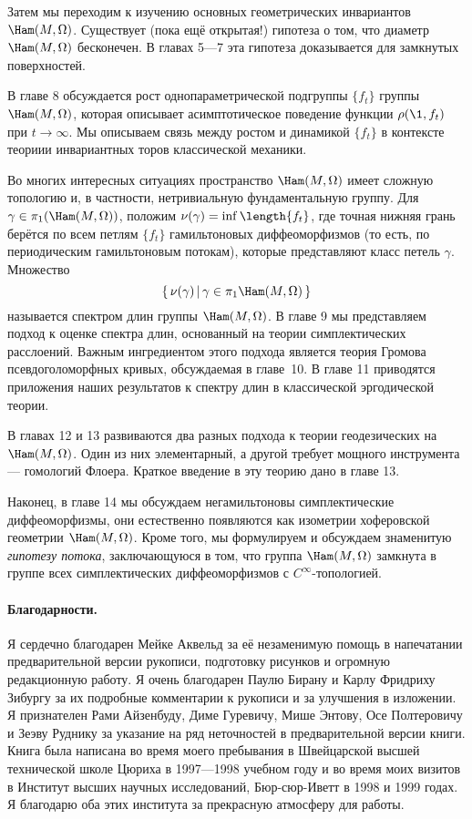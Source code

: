 Затем мы переходим к изучению основных геометрических инвариантов $\Ham(M,\Omega)$.
Существует (пока ещё открытая!) гипотеза о том, что диаметр $\Ham(M,\Omega)$ бесконечен.
В главах 5—7 эта гипотеза доказывается для замкнутых поверхностей.

В главе 8 обсуждается рост однопараметрической подгруппы $\{f_t\}$ группы $\Ham(M,\Omega)$, которая описывает асимптотическое поведение функции $\rho (\1, f_t)$ при $t \to \infty$.
Мы описываем связь между ростом и динамикой $\{f_t\}$ в контексте
теориии инвариантных торов классической механики.

Во многих интересных ситуациях пространство $\Ham(M,\Omega)$ имеет сложную топологию и, в частности, нетривиальную фундаментальную группу.
Для $\gamma\in\pi_1(\Ham(M,\Omega))$, положим $\nu(\gamma) \z= \inf \length \{f_t\}$, где
точная нижняя грань берётся по всем петлям $\{f_t\}$ гамильтоновых
диффеоморфизмов (то есть, по периодическим гамильтоновым потокам),
которые представляют класс петель $\gamma$.
Множество
\[\set{\nu(\gamma)}{\gamma\in\pi_{1}\Ham(M,\Omega)}\]
называется спектром длин группы $\Ham(M,\Omega)$.
В главе 9 мы представляем подход к оценке спектра длин, основанный на
теории симплектических расслоений. 
Важным ингредиентом этого подхода является теория Громова
псевдоголоморфных кривых, обсуждаемая в главе~10. 
В главе 11 приводятся приложения наших результатов к спектру длин в
классической эргодической теории.

В главах 12 и 13 развиваются два разных подхода к теории геодезических на $\Ham(M,\Omega)$.
Один из них элементарный, а другой требует мощного инструмента — гомологий Флоера.
Краткое введение в эту теорию дано в главе 13.

Наконец, в главе 14 мы обсуждаем негамильтоновы симплектические
диффеоморфизмы, они естественно появляются как изометрии хоферовской
геометрии $\Ham(M,\Omega)$. 
Кроме того, мы формулируем и обсуждаем знаменитую \emph{гипотезу потока},
заключающуюся в том, что группа $\Ham(M,\Omega)$ замкнута в группе
всех симплектических диффеоморфизмов с $C^\infty$-топологией.  


\paragraph*{Благодарности.}
Я сердечно благодарен Мейке Аквельд %
за её незаменимую помощь в напечатании предварительной версии рукописи,
подготовку рисунков и огромную редакционную работу.
Я очень благодарен Паулю Бирану и Карлу Фридриху Зибургу за их подробные комментарии к рукописи и за улучшения в изложении.
Я признателен 
Рами Айзенбуду,
Диме Гуревичу, 
Мише Энтову, 
Осе Полтеровичу
и Зеэву Руднику за указание на ряд неточностей в предварительной версии книги.
Книга была написана во время моего пребывания в Швейцарской высшей технической школе Цюриха в 1997—1998 учебном году и во время моих визитов в Институт высших научных исследований, Бюр-сюр-Иветт в 1998 и 1999 годах.
Я благодарю оба этих института за прекрасную атмосферу для работы. 
